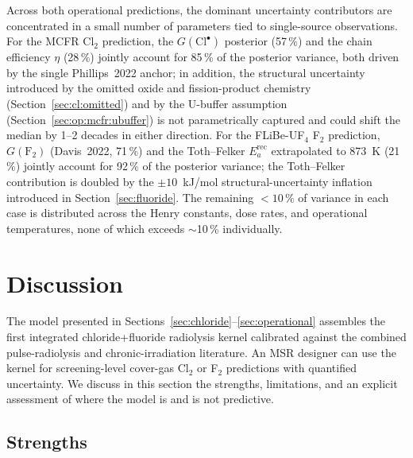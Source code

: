 \documentclass[11pt]{article}
\theoremstyle{plain}
\theoremstyle{definition}
\theoremstyle{remark}
\newcommand{\Ea}{E_a}
\begin{document}
Across both operational predictions, the dominant uncertainty
contributors are concentrated in a small number of parameters tied to
single-source observations.  For the MCFR Cl$_2$ prediction, the
$G(\mathrm{Cl}^{\bullet})$ posterior (57\,\%) and the chain efficiency
$\eta$ (28\,\%) jointly account for 85\,\% of the posterior variance,
both driven by the single Phillips~2022 anchor; in addition, the
structural uncertainty introduced by the omitted oxide and
fission-product chemistry (Section~\ref{sec:cl:omitted}) and by the
U-buffer assumption (Section~\ref{sec:op:mcfr:ubuffer}) is not
parametrically captured and could shift the median by 1--2 decades in
either direction.  For the FLiBe-UF$_4$ F$_2$ prediction, $G(\mathrm{F}_2)$
(Davis~2022, 71\,\%) and the Toth--Felker $\Ea^{\mathrm{rec}}$
extrapolated to 873~K (21\,\%) jointly account for 92\,\% of the
posterior variance; the Toth--Felker contribution is doubled by the
$\pm 10$~kJ/mol structural-uncertainty inflation introduced in
Section~\ref{sec:fluoride}.  The remaining $<\!10\,\%$ of variance in
each case is distributed across the Henry constants, dose rates, and
operational temperatures, none of which exceeds $\sim$10\,\%
individually.

\section{Discussion}\label{sec:discussion}

The model presented in
Sections~\ref{sec:chloride}--\ref{sec:operational} assembles the first
integrated chloride+fluoride radiolysis kernel calibrated against the
combined pulse-radiolysis and chronic-irradiation literature.  An MSR
designer can use the kernel for screening-level cover-gas Cl$_2$ or
F$_2$ predictions with quantified uncertainty.  We discuss in this
section the strengths, limitations, and an explicit assessment of where
the model is and is not predictive.

\subsection{Strengths}
\end{document}
